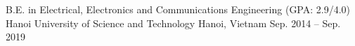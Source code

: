 \begin{cventries}
  \cventry
    {B.E. in Electrical, Electronics and Communications Engineering (GPA: 2.9/4.0)} %
    {Hanoi University of Science and Technology} %
    {Hanoi, Vietnam} %
    {Sep. 2014 -- Sep. 2019} %
\end{cventries}
